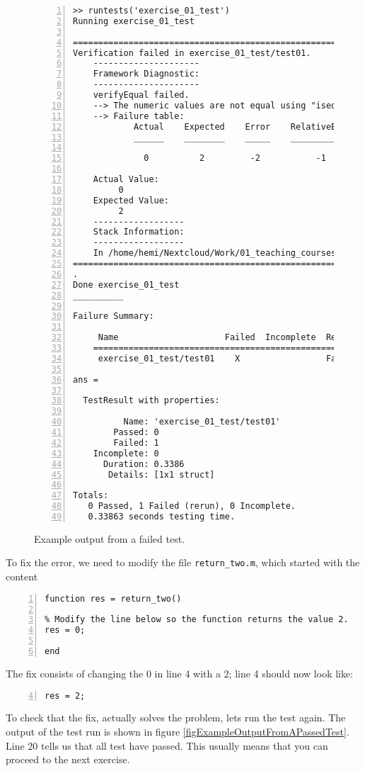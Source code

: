 \begin{figure}[p]
\begin{lstlisting}[basicstyle=\scriptsize, breaklines=true, numbers=left, linebackgroundcolor={\lstcolorlines[yellow]{5,17,18,19,20,24,48}}]
>> runtests('exercise_01_test')
Running exercise_01_test

================================================================================
Verification failed in exercise_01_test/test01.
    ---------------------
    Framework Diagnostic:
    ---------------------
    verifyEqual failed.
    --> The numeric values are not equal using "isequaln".
    --> Failure table:
            Actual    Expected    Error    RelativeError
            ______    ________    _____    _____________
        
              0          2         -2           -1      
    
    Actual Value:
         0
    Expected Value:
         2
    ------------------
    Stack Information:
    ------------------
    In /home/hemi/Nextcloud/Work/01_teaching_courses/2021-09-01_EMAIP/materials/notes_on_matlab/exercises_with_unittests/01_functions/exercise_01_test.m (test01) at 12
================================================================================
.
Done exercise_01_test
__________

Failure Summary:

     Name                     Failed  Incomplete  Reason(s)
    ======================================================================
     exercise_01_test/test01    X                 Failed by verification.

ans = 

  TestResult with properties:

          Name: 'exercise_01_test/test01'
        Passed: 0
        Failed: 1
    Incomplete: 0
      Duration: 0.3386
       Details: [1x1 struct]

Totals:
   0 Passed, 1 Failed (rerun), 0 Incomplete.
   0.33863 seconds testing time.
\end{lstlisting}
\caption{Example output from a failed test.}
\label{figUnittestExampleOutput}
\end{figure}


To fix the error, we need to modify the file \verb!return_two.m!, which started with the content
\begin{lstlisting}[numbers=left]
function res = return_two()

% Modify the line below so the function returns the value 2.
res = 0;

end
\end{lstlisting}
The fix consists of changing the 0 in line 4 with a 2; line
4 should now look like:
\begin{lstlisting}[numbers=left, firstnumber = 4]
res = 2;
\end{lstlisting}
To check that the fix, actually solves the problem, lets run the 
test again.
The output of the test run is shown in figure \ref{figExampleOutputFromAPassedTest}.
Line 20 tells us that all test have passed.
This usually means that you can proceed to the next exercise.

